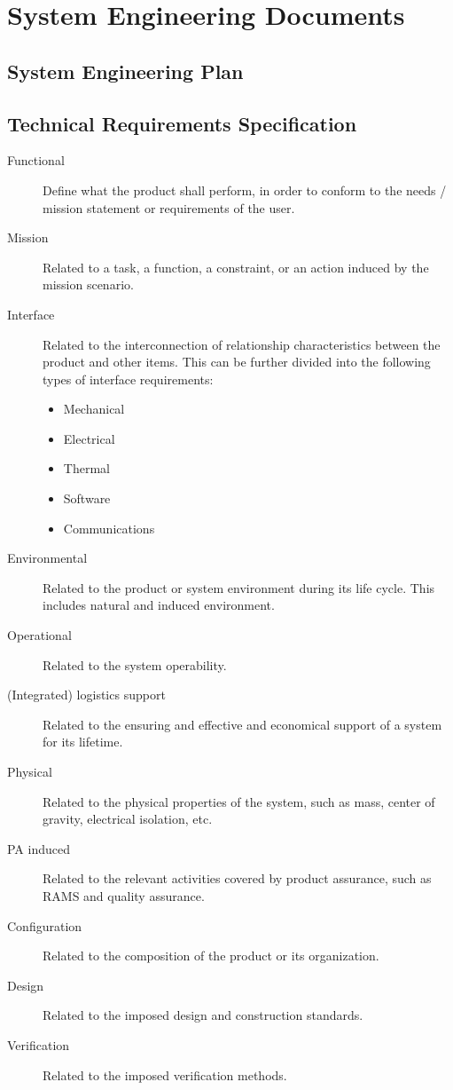 \section{System Engineering Documents}


\subsection{System Engineering Plan}
\label{sec:System Engineering Plan}


\subsection{Technical Requirements Specification}
\label{sec:Technical Requirements Specification}

\begin{description}
\item[Functional]
Define what the product shall perform, in order to conform to the needs / mission statement or requirements of the user.
\item[Mission]
Related to a task, a function, a constraint, or an action induced by the mission scenario.
\item[Interface]
Related to the interconnection of relationship characteristics between the product and other items. This can be further divided into the following types of interface requirements:
\begin{itemize}
\item Mechanical
\item Electrical
\item Thermal
\item Software
\item Communications
\end{itemize}
\item[Environmental]
Related to the product or system environment during its life cycle. This includes natural and induced environment.
\item[Operational]
Related to the system operability.
\item[(Integrated) logistics support]
Related to the ensuring and effective and economical support of a system for its lifetime.
\item[Physical]
Related to the physical properties of the system, such as mass, center of gravity, electrical isolation, etc.
\item[PA induced]
Related to the relevant activities covered by product assurance, such as RAMS and quality assurance.
\item[Configuration]
Related to the composition of the product or its organization.
\item[Design]
Related to the imposed design and construction standards.
\item[Verification]
Related to the imposed verification methods.
\end{description}


